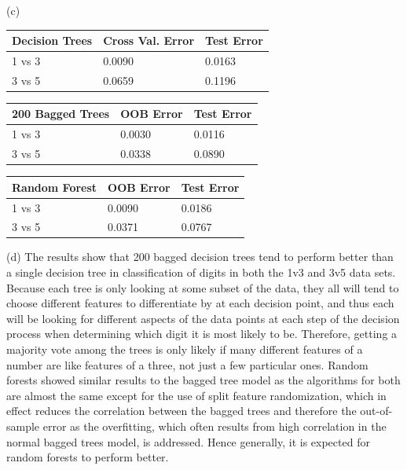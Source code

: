 \documentclass[12pt,letterpaper]{article}
\begin{document}
\begin{description}
	\item (c) 
\begin{table}[h]
\begin{tabular}{|l|l|l|l|}
\hline
\textbf{Decision Trees} & \multicolumn{2}{l|}{\textbf{Cross Val. Error}} & \textbf{Test Error} \\ \hline
1 vs 3                  & \multicolumn{2}{l|}{0.0090}                   & 0.0163             \\ \hline
3 vs 5                  & \multicolumn{2}{l|}{0.0659}                   & 0.1196	         \\ \hline
\end{tabular}
\end{table}
\begin{table}[h]
\begin{tabular}{|l|l|l|l|}
\hline
\textbf{200 Bagged Trees} & \multicolumn{2}{l|}{\textbf{OOB Error}} & \textbf{Test Error} \\ \hline
1 vs 3                    & \multicolumn{2}{l|}{0.0030}             & 0.0116              \\ \hline
3 vs 5                    & \multicolumn{2}{l|}{0.0338}             & 0.0890              \\ \hline
\end{tabular}
\end{table}
\begin{table}[h]
\begin{tabular}{|l|l|l|l|}
\hline
\textbf{Random Forest} & \multicolumn{2}{l|}{\textbf{OOB Error}} & \textbf{Test Error} \\ \hline
1 vs 3                    & \multicolumn{2}{l|}{0.0090}             & 0.0186              \\ \hline
3 vs 5                    & \multicolumn{2}{l|}{0.0371}             & 0.0767              \\ \hline
\end{tabular}
\end{table}
	\item (d) The results show that 200 bagged decision trees tend to perform better than a single decision tree in classification of digits in both the 1v3 and 3v5 data sets. Because each tree is only looking at some subset of the data, they all will tend to choose different features to differentiate by at each decision point, and thus each will be looking for different aspects of the data points at each step of the decision process when determining which digit it is most likely to be. Therefore, getting a majority vote among the trees is only likely if many different features of a number are like features of a three, not just a few particular ones. Random forests showed similar results to the bagged tree model as the algorithms for both are almost the same except for the use of split feature randomization, which in effect reduces the correlation between the bagged trees and therefore the out-of-sample error as the overfitting, which often results from high correlation in the normal bagged trees model, is addressed. Hence generally, it is expected for random forests to perform better.

\end{description}
\end{document}
